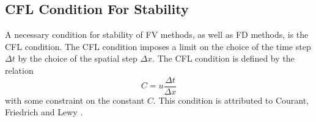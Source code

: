 \FloatBarrier
\subsection{CFL Condition For Stability}
A necessary condition for stability of FV methods, as well as FD methods, is the CFL condition. The CFL condition imposes a limit on the choice of the time step $\Delta t$ by the choice of the spatial step $\Delta x$. The CFL condition is defined by the relation
%
\begin{equation}
\label{CFLeq}
C = u \frac{\Delta t}{\Delta x}
\end{equation}
%
with some constraint on the constant $C$. This condition is attributed to Courant, Friedrich and Lewy \cite{cflCite}.

